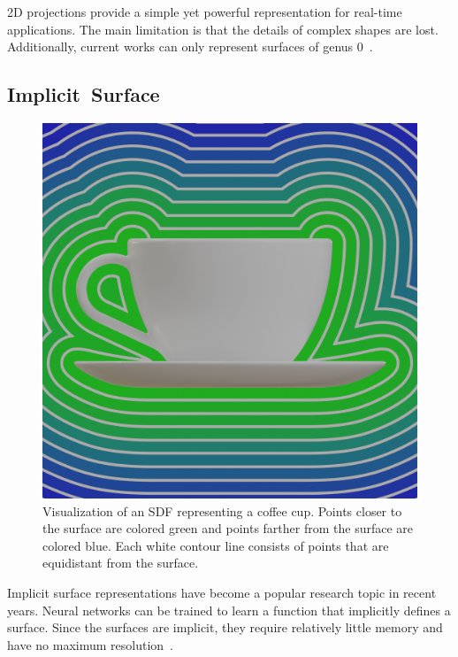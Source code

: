 2D projections provide a simple yet powerful representation for real-time applications. The main limitation is that the details of complex shapes are lost. Additionally, current works can only represent surfaces of genus 0~\cite{Sinha2017}.

\newpage


\subsection{Implicit~Surface}
\label{subsec:implicit_surface}

\begin{figure}[ht]
	\centering
	\includegraphics[scale=0.2]{Images/SDF Cup}
	\caption{Visualization of an SDF representing a coffee cup. Points closer to the surface are colored green and points farther from the surface are colored blue. Each white contour line consists of points that are equidistant from the surface.}
	\label{fig:sdf_cup}
\end{figure}

Implicit surface representations have become a popular research topic in recent years. Neural networks can be trained to learn a function that implicitly defines a surface. Since the surfaces are implicit, they require relatively little memory and have no maximum resolution~\cite{Xiao2020}.


